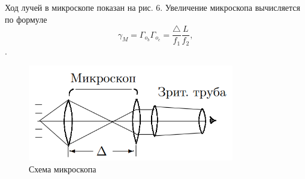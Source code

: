 \documentclass[a4paper,12pt]{article}
\theoremstyle{definition}
\begin{document}
Ход лучей в микроскопе показан на рис. 6. Увеличение микроскопа вычисляется по формуле
    \begin{equation}
        \gamma_M = \Gamma_{o_b} \Gamma_{o_c} = \frac{\triangle}{f_1} \frac{L}{f_2},
    \end{equation}.

    \begin{figure}[h]
    \centering
    \includegraphics[width=9cm]{micro_2.PNG}
    \caption{Схема микроскопа}
    \label{fig:vac}
\end{figure}


\newpage

\end{document}
